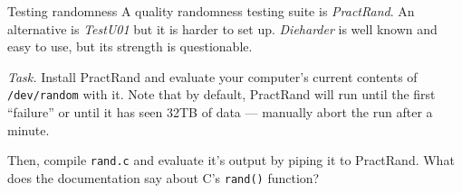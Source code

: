 \documentclass{practice}
\begin{document}
\begin{task}{Testing randomness}
  A quality randomness testing suite is \emph{PractRand}\footnotemark{}.
  An alternative is \emph{TestU01}\footnotemark{} but it is harder to set up.
  \emph{Dieharder}\footnotemark{} is well known and easy to use, but its strength is questionable.

  \textit{Task.}
  Install PractRand and evaluate your computer's current contents of \texttt{/dev/random} with it.
  Note that by default, PractRand will run until the first \enquote{failure} or until it has seen 32TB of data --- manually abort the run after a minute.

  Then, compile \texttt{rand.c} and evaluate it's output by piping it to PractRand.
  What does the documentation say about C's \texttt{rand()} function?
\end{task}
\end{document}
